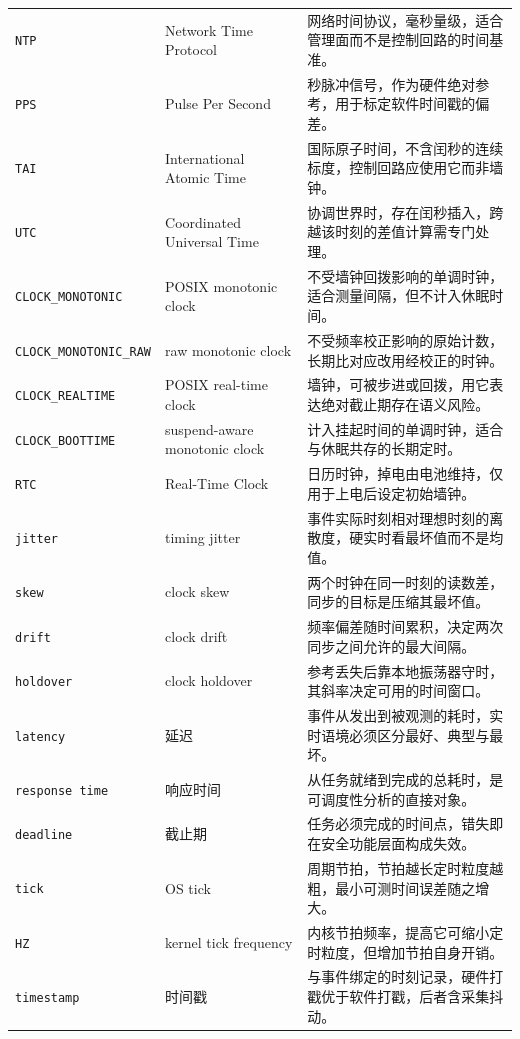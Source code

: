 \documentclass[12pt,a4paper,fontset=fandol]{ctexbook}
\newcommand{\Tp}[1]{\texttt{#1}}
\newcommand{\Bk}{\discretionary{}{}{}}
\begin{document}
\begin{longtable}{@{} >{\raggedright\arraybackslash}p{} >{\raggedright\arraybackslash}p{} >{\raggedright\arraybackslash}p{}@{}}
\Tp{NTP} & Network Time Protocol & 网络时间协议，毫秒量级，适合管理面而不是控制回路的时间基准。 \\
\Tp{PPS} & Pulse Per Second & 秒脉冲信号，作为硬件绝对参考，用于标定软件时间戳的偏差。 \\
\Tp{TAI} & International Atomic Time & 国际原子时间，不含闰秒的连续标度，控制回路应使用它而非墙钟。 \\
\Tp{UTC} & Coordinated Universal Time & 协调世界时，存在闰秒插入，跨越该时刻的差值计算需专门处理。 \\
\Tp{CLOCK\_MONOTONIC} & POSIX monotonic clock & 不受墙钟回拨影响的单调时钟，适合测量间隔，但不计入休眠时间。 \\
\Tp{CLOCK\_{\Bk}MONOTONIC\_{\Bk}RAW} & raw monotonic clock & 不受频率校正影响的原始计数，长期比对应改用经校正的时钟。 \\
\Tp{CLOCK\_REALTIME} & POSIX real-time clock & 墙钟，可被步进或回拨，用它表达绝对截止期存在语义风险。 \\
\Tp{CLOCK\_BOOTTIME} & suspend-aware monotonic clock & 计入挂起时间的单调时钟，适合与休眠共存的长期定时。 \\
\Tp{RTC} & Real-Time Clock & 日历时钟，掉电由电池维持，仅用于上电后设定初始墙钟。 \\
\Tp{jitter} & timing jitter & 事件实际时刻相对理想时刻的离散度，硬实时看最坏值而不是均值。 \\
\Tp{skew} & clock skew & 两个时钟在同一时刻的读数差，同步的目标是压缩其最坏值。 \\
\Tp{drift} & clock drift & 频率偏差随时间累积，决定两次同步之间允许的最大间隔。 \\
\Tp{holdover} & clock holdover & 参考丢失后靠本地振荡器守时，其斜率决定可用的时间窗口。 \\
\Tp{latency} & 延迟 & 事件从发出到被观测的耗时，实时语境必须区分最好、典型与最坏。 \\
\Tp{response time} & 响应时间 & 从任务就绪到完成的总耗时，是可调度性分析的直接对象。 \\
\Tp{deadline} & 截止期 & 任务必须完成的时间点，错失即在安全功能层面构成失效。 \\
\Tp{tick} & OS tick & 周期节拍，节拍越长定时粒度越粗，最小可测时间误差随之增大。 \\
\Tp{HZ} & kernel tick frequency & 内核节拍频率，提高它可缩小定时粒度，但增加节拍自身开销。 \\
\Tp{timestamp} & 时间戳 & 与事件绑定的时刻记录，硬件打戳优于软件打戳，后者含采集抖动。 \\
\end{longtable}
\end{document}
